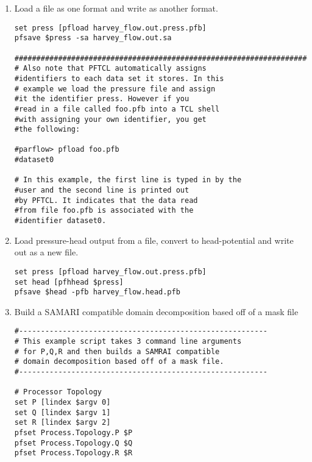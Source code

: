 \begin{enumerate}

\item Load a file as one format and write as another format.
\begin{display}\begin{verbatim}
set press [pfload harvey_flow.out.press.pfb]
pfsave $press -sa harvey_flow.out.sa

#####################################################################
# Also note that PFTCL automatically assigns 
#identifiers to each data set it stores. In this 
# example we load the pressure file and assign 
#it the identifier press. However if you  
#read in a file called foo.pfb into a TCL shell 
#with assigning your own identifier, you get 
#the following:

#parflow> pfload foo.pfb
#dataset0

# In this example, the first line is typed in by the
#user and the second line is printed out 
#by PFTCL. It indicates that the data read 
#from file foo.pfb is associated with the 
#identifier dataset0.

\end{verbatim}\end{display}


\item Load pressure-head output from a file, convert to head-potential and write out as a new file.

\begin{display}\begin{verbatim}
set press [pfload harvey_flow.out.press.pfb]
set head [pfhhead $press]
pfsave $head -pfb harvey_flow.head.pfb

\end{verbatim}\end{display}



\item Build a SAMARI compatible domain decomposition based off of a mask file
\begin{display}\begin{verbatim}
#---------------------------------------------------------
# This example script takes 3 command line arguments
# for P,Q,R and then builds a SAMRAI compatible
# domain decomposition based off of a mask file.
#---------------------------------------------------------

# Processor Topology
set P [lindex $argv 0]
set Q [lindex $argv 1]
set R [lindex $argv 2]
pfset Process.Topology.P $P
pfset Process.Topology.Q $Q
pfset Process.Topology.R $R


\end{verbatim}
\end{display}
\end{enumerate}

